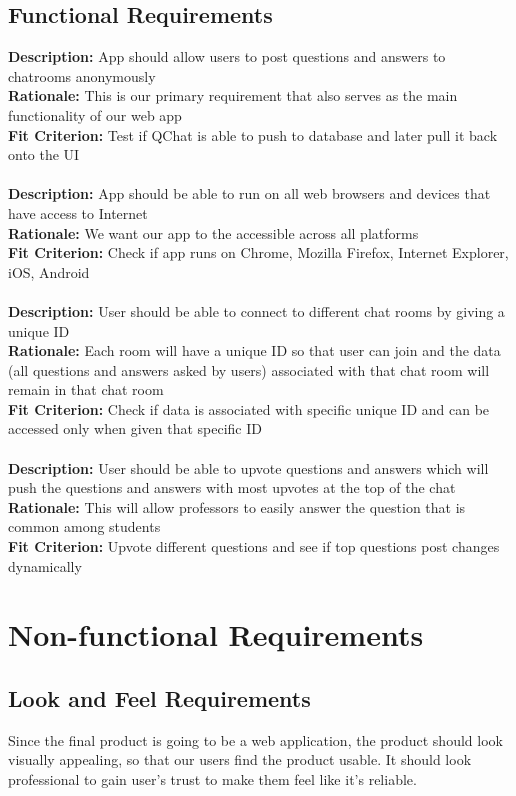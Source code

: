 \documentclass[12pt, titlepage]{article}
\begin{document}
\subsection{Functional Requirements}

\textbf{Description:} App should allow users to post questions and answers to chatrooms anonymously 
\\
\textbf{Rationale:} This is our primary requirement that also serves as the main functionality of our web app 
\\
\textbf{Fit Criterion:} Test if QChat is able to push to database and later pull it back onto the UI 
\\
\\
\textbf{Description:} App should be able to run on all web browsers and devices that have access to Internet 
\\
\textbf{Rationale:} We want our app to the accessible across all platforms 
\\
\textbf{Fit Criterion:} Check if app runs on Chrome, Mozilla Firefox, Internet Explorer, iOS, Android 
\\
\\
\textbf{Description:} User should be able to connect to different chat rooms by giving a unique ID  
\\
\textbf{Rationale:} Each room will have a unique ID so that user can join and the data (all questions and answers asked by users)  associated with that chat room will remain in that chat room 
\\
\textbf{Fit Criterion:} Check if data is associated with specific unique ID and can be accessed only when given that specific ID 
\\
\\
\textbf{Description:} User should be able to upvote questions and answers which will push the questions and answers with most upvotes at the top of the chat
\\
\textbf{Rationale:} This will allow professors to easily answer the question that is common among students 
\\
\textbf{Fit Criterion:} Upvote different questions and see if top questions post changes dynamically 

\section{Non-functional Requirements}

\subsection{Look and Feel Requirements}
Since the final product is going to be a web application, the product should look visually appealing, so that our users find the product usable. It should look professional to gain user’s trust to make them feel like it's reliable.
\end{document}
